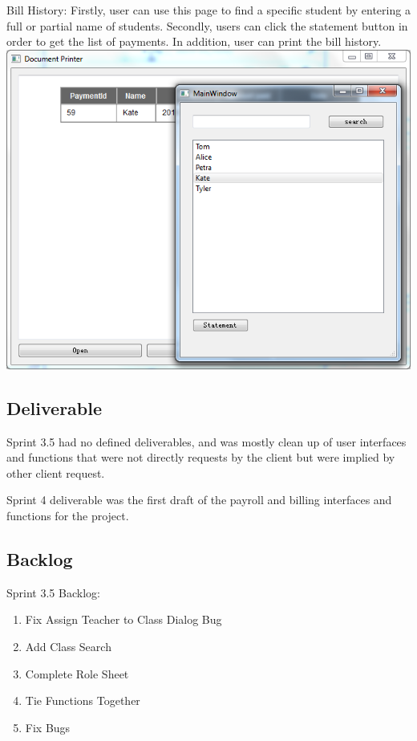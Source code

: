 Bill History:
Firstly, user can use this page to find a specific student by entering a full or partial name of students. Secondly, users can click the statement button in order to get the list of payments. In addition, user can print the bill history.\\

\includegraphics[scale=0.5]{billHistory.png}


\subsection{Deliverable}

Sprint 3.5 had no defined deliverables, and was mostly clean up of user interfaces and functions that were not directly requests by the client but were implied by other client request.

Sprint 4 deliverable was the first draft of the payroll and billing interfaces and functions for the project.\\


\subsection{Backlog}

Sprint 3.5 Backlog:

\begin{enumerate}
\item Fix Assign Teacher to Class Dialog Bug
\item Add Class Search
\item Complete Role Sheet
\item Tie Functions Together
\item Fix Bugs
\end{enumerate}

